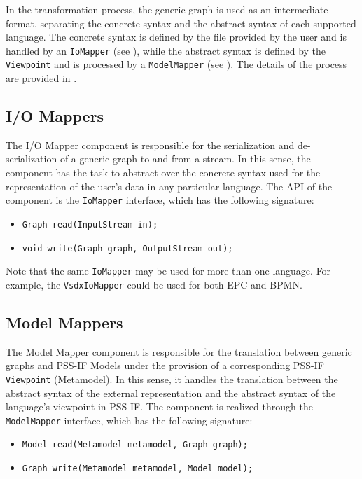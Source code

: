 In the transformation process, the generic graph is used as an intermediate format, separating the concrete syntax and the abstract syntax of each supported language. The concrete syntax is defined by the file provided by the user and is handled by an \texttt{IoMapper} (see ), while the abstract syntax is defined by the \texttt{Viewpoint} and is processed by a \texttt{ModelMapper} (see ). The details of the process are provided in .

\subsection{I/O Mappers}
\label{sec:impl:comp:io}

The I/O Mapper component is responsible for the serialization and de-serialization of a generic graph to and from a stream. In this sense, the component has the task to abstract over the concrete syntax used for the representation of the user's data in any particular language. The API of the component is the \texttt{IoMapper} interface, which has the following signature:

\begin{itemize}
\item \texttt{Graph read(InputStream in);}
\item \texttt{void write(Graph graph, OutputStream out);}
\end{itemize}

Note that the same \texttt{IoMapper} may be used for more than one language. For example, the \texttt{VsdxIoMapper} could be used for both EPC and BPMN.

\subsection{Model Mappers}
\label{sec:impl:comp:model}

The Model Mapper component is responsible for the translation between generic graphs and PSS-IF Models under the provision of a corresponding PSS-IF \texttt{Viewpoint} (Metamodel). In this sense, it handles the translation between the abstract syntax of the external representation and the abstract syntax of the language's viewpoint in PSS-IF. The component is realized through the \texttt{ModelMapper} interface, which has the following signature:

\begin{itemize}
\item \texttt{Model read(Metamodel metamodel, Graph graph);}
\item \texttt{Graph write(Metamodel metamodel, Model model);}
\end{itemize}

